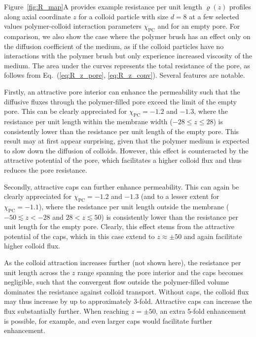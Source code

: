 \documentclass[12pt, a4paper]{article}
\begin{document}
Figure~\ref{fig:R_map}A provides example resistance per unit length $\varrho(z)$ profiles along axial coordinate $z$ for a colloid particle with size $d=8$ at a few selected values polymer-colloid interaction parameters $\chi_{\text{PC}}$ and for an empty pore.
For comparison, we also show the case where the polymer brush has an effect only on the diffusion coefficient of the medium, as if the colloid particles have no interactions with the polymer brush but only experience increased viscosity of the medium.
The area under the curves represents the total resistance of the pore, as follows from Eq.~(\ref{eq:R_z_pore}, \ref{eq:R_z_conv}).
Several features are notable. 

Firstly, an attractive pore interior can enhance the permeability such that the diffusive fluxes through the polymer-filled pore exceed the limit of the empty pore.
This can be clearly appreciated for $\chi_{\text{PC}} = -1.2$ and $-1.3$, where the resistance per unit length within the membrane width ($-28 \leq z \leq 28$) is consistently lower than the resistance per unit length of the empty pore.
This result may at first appear surprising, given that the polymer medium is expected to slow down the diffusion of colloids.
However, this effect is counteracted by the attractive potential of the pore, which facilitates a higher colloid flux and thus reduces the pore resistance.

Secondly, attractive caps can further enhance permeability.
This can again be clearly appreciated for $\chi_{\text{PC}} = -1.2$ and $-1.3$ (and to a lesser extent for $\chi_{\text{PC}} = -1.1$), where the resistance per unit length outside the membrane ($-50 \lesssim z < -28$ and $28 < z \lesssim 50$) is consistently lower than the resistance per unit length for the empty pore. 
Clearly, this effect stems from the attractive potential of the caps, which in this case extend to $z \approx \pm 50$ and again facilitate higher colloid flux. 

As the colloid attraction increases further (not shown here), the resistance per unit length across the $z$ range spanning the pore interior and the caps becomes negligible, such that the convergent flow outside the polymer-filled volume dominates the resistance against colloid transport.
Without caps, the colloid flux may thus increase by up to approximately 3-fold. 
Attractive caps can increase the flux substantially further.
When reaching $z = \pm 50$, an extra 5-fold enhancement is possible, for example, and even larger caps would facilitate further enhancement.
\end{document}
